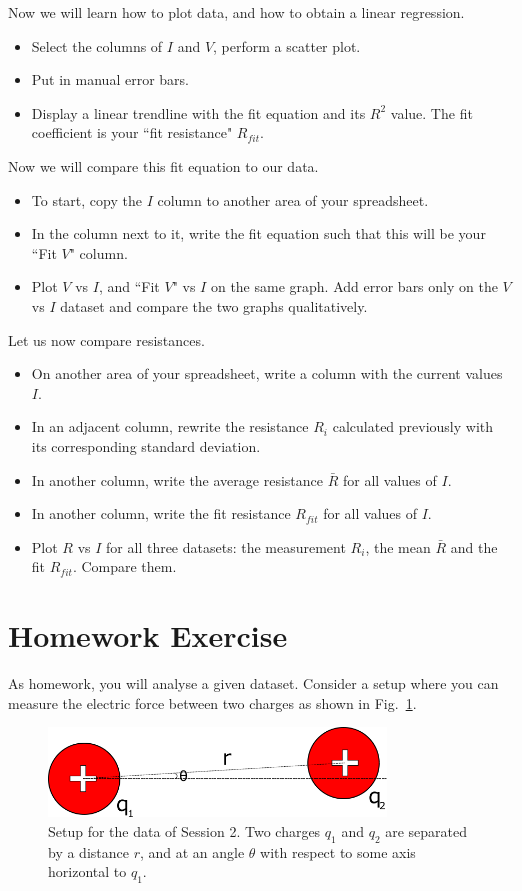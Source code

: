 \documentclass[12pt]{article}
\begin{document}
\noindent Now we will learn how to plot data, and how to obtain a linear regression.
\begin{itemize}
\item Select the columns of $I$ and $V$, perform a scatter plot.
\item Put in manual error bars.
\item Display a linear trendline with the fit equation and its $R^2$ value. The fit coefficient is your ``fit resistance" $R_{fit}$.
\end{itemize}

\noindent Now we will compare this fit equation to our data. 
\begin{itemize}
\item To start, copy the $I$ column to another area of your spreadsheet.
\item In the column next to it, write the fit equation such that this will be your ``Fit $V$" column.
\item Plot $V$ vs $I$, and ``Fit $V$" vs $I$ on the same graph. Add error bars only on the $V$ vs $I$ dataset and compare the two graphs qualitatively.
\end{itemize}

\noindent Let us now compare resistances.
\begin{itemize}
\item On another area of your spreadsheet, write a column with the current values $I$. 
\item In an adjacent column, rewrite the resistance $R_i$ calculated previously with its corresponding standard deviation.
\item In another column, write the average resistance $\bar{R}$ for all values of $I$.
\item In another column, write the fit resistance $R_{fit}$ for all values of $I$.
\item Plot $R$ vs $I$ for all three datasets: the measurement $R_i$, the mean $\bar{R}$ and the fit $R_{fit}$. Compare them.
\end{itemize}

\section{Homework Exercise}
As homework, you will analyse a given dataset. Consider a setup where you can measure the electric force between two charges as shown in Fig.~\ref{Fig:lab0-session2-setup}. 
\begin{figure}[h]
\centering
\includegraphics[width=0.8\textwidth]{lab0-session2}
\caption{Setup for the data of Session 2. Two charges $q_1$ and $q_2$ are separated by a distance $r$, and at an angle $\theta$ with respect to some axis horizontal to $q_1$.}
\label{Fig:lab0-session2-setup}
\end{figure}
\end{document}
